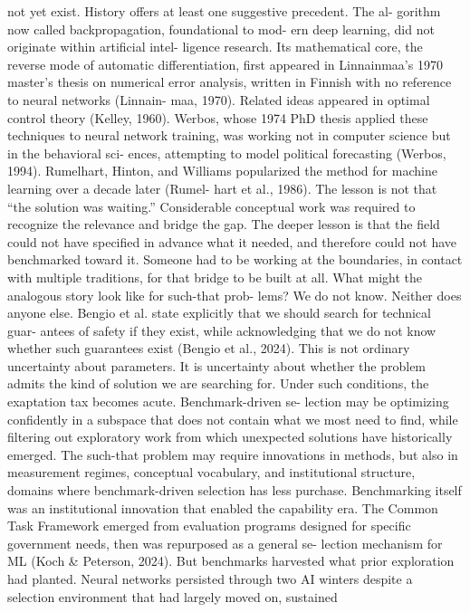 not yet exist.
History offers at least one suggestive precedent. The al-
gorithm now called backpropagation, foundational to mod-
ern deep learning, did not originate within artificial intel-
ligence research. Its mathematical core, the reverse mode
of automatic differentiation, first appeared in Linnainmaa’s
1970 master’s thesis on numerical error analysis, written
in Finnish with no reference to neural networks (Linnain-
maa, 1970). Related ideas appeared in optimal control
theory (Kelley, 1960). Werbos, whose 1974 PhD thesis
applied these techniques to neural network training, was
working not in computer science but in the behavioral sci-
ences, attempting to model political forecasting (Werbos,
1994). Rumelhart, Hinton, and Williams popularized the
method for machine learning over a decade later (Rumel-
hart et al., 1986). The lesson is not that “the solution was
waiting.” Considerable conceptual work was required to
recognize the relevance and bridge the gap. The deeper
lesson is that the field could not have specified in advance
what it needed, and therefore could not have benchmarked
toward it. Someone had to be working at the boundaries, in
contact with multiple traditions, for that bridge to be built at
all.
What might the analogous story look like for such-that prob-
lems? We do not know. Neither does anyone else. Bengio et
al. state explicitly that we should search for technical guar-
antees of safety if they exist, while acknowledging that we
do not know whether such guarantees exist (Bengio et al.,
2024). This is not ordinary uncertainty about parameters. It
is uncertainty about whether the problem admits the kind
of solution we are searching for. Under such conditions,
the exaptation tax becomes acute. Benchmark-driven se-
lection may be optimizing confidently in a subspace that
does not contain what we most need to find, while filtering
out exploratory work from which unexpected solutions have
historically emerged. The such-that problem may require
innovations in methods, but also in measurement regimes,
conceptual vocabulary, and institutional structure, domains
where benchmark-driven selection has less purchase.
Benchmarking itself was an institutional innovation that
enabled the capability era. The Common Task Framework
emerged from evaluation programs designed for specific
government needs, then was repurposed as a general se-
lection mechanism for ML (Koch \& Peterson, 2024). But
benchmarks harvested what prior exploration had planted.
Neural networks persisted through two AI winters despite a
selection environment that had largely moved on, sustained
